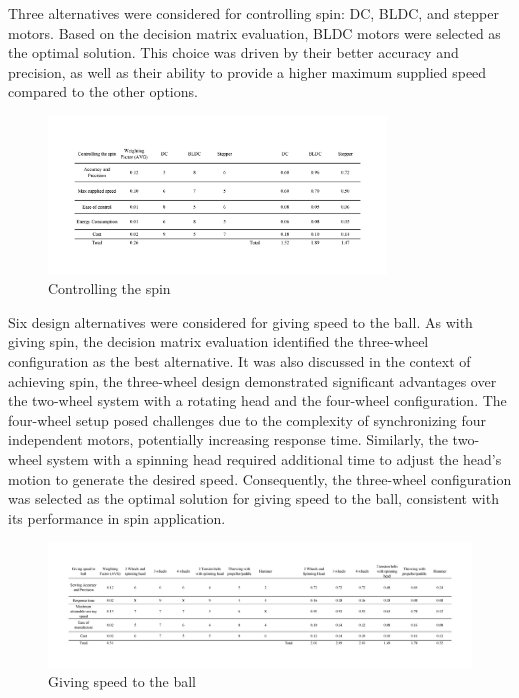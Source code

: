 \documentclass[12pt]{article}
\begin{document}
Three alternatives were considered for controlling spin: DC, BLDC, and stepper motors. Based on the decision matrix evaluation, BLDC motors were selected as the optimal solution. This choice was driven by their better accuracy and precision, as well as their ability to provide a higher maximum supplied speed compared to the other options.
\begin{figure}[H]
    \centering
    \includegraphics[width=0.8\textwidth]{Decision matrices/controlling spin.png}
    \caption{Controlling the spin}
\end{figure}


Six design alternatives were considered for giving speed to the ball. As with giving spin, the decision matrix evaluation identified the three-wheel configuration as the best alternative. It was also discussed in the context of achieving spin, the three-wheel design demonstrated significant advantages over the two-wheel system with a rotating head and the four-wheel configuration. The four-wheel setup posed challenges due to the complexity of synchronizing four independent motors, potentially increasing response time. Similarly, the two-wheel system with a spinning head required additional time to adjust the head's motion to generate the desired speed. Consequently, the three-wheel configuration was selected as the optimal solution for giving speed to the ball, consistent with its performance in spin application.

\begin{figure}[H]
    \centering
    \includegraphics[width=1\textwidth]{Decision matrices/speed.png}
    \caption{Giving speed to the ball}
\end{figure}
\end{document}
